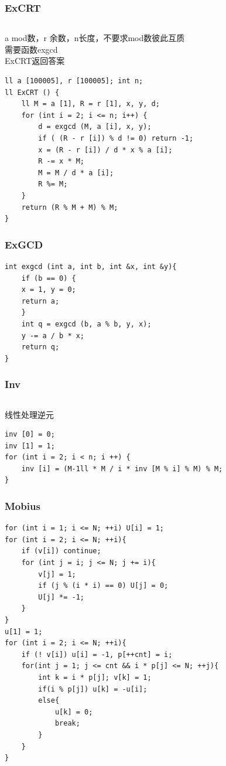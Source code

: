 \documentclass[twoside]{article}
\begin{document}
\subsubsection{ExCRT}
\begin{lstlisting}
\end{lstlisting}
a mod数，r 余数，n长度，不要求mod数彼此互质\\
需要函数exgcd\\
ExCRT返回答案
\begin{lstlisting}
ll a [100005], r [100005]; int n;
ll ExCRT () {
    ll M = a [1], R = r [1], x, y, d;
    for (int i = 2; i <= n; i++) {
        d = exgcd (M, a [i], x, y);
        if ( (R - r [i]) % d != 0) return -1;
        x = (R - r [i]) / d * x % a [i];
        R -= x * M;
        M = M / d * a [i];
        R %= M;
    }
    return (R % M + M) % M;
}\end{lstlisting}
\subsubsection{ExGCD}
\begin{lstlisting}
int exgcd (int a, int b, int &x, int &y){
    if (b == 0) {
	x = 1, y = 0;
	return a;
    }
    int q = exgcd (b, a % b, y, x);
    y -= a / b * x;
    return q;
}\end{lstlisting}
\subsubsection{Inv}
\begin{lstlisting}
\end{lstlisting}
线性处理逆元
\begin{lstlisting}
inv [0] = 0;
inv [1] = 1;
for (int i = 2; i < n; i ++) {
    inv [i] = (M-1ll * M / i * inv [M % i] % M) % M;
}\end{lstlisting}
\subsubsection{Mobius}
\begin{lstlisting}
for (int i = 1; i <= N; ++i) U[i] = 1;
for (int i = 2; i <= N; ++i){
    if (v[i]) continue;
    for (int j = i; j <= N; j += i){
        v[j] = 1;
        if (j % (i * i) == 0) U[j] = 0;
        U[j] *= -1;
    }
}
u[1] = 1;
for (int i = 2; i <= N; ++i){
    if (! v[i]) u[i] = -1, p[++cnt] = i;
    for(int j = 1; j <= cnt && i * p[j] <= N; ++j){
        int k = i * p[j]; v[k] = 1;
        if(i % p[j]) u[k] = -u[i];
        else{
            u[k] = 0;
            break;
        }
    }
}
\end{lstlisting}
\end{document}
